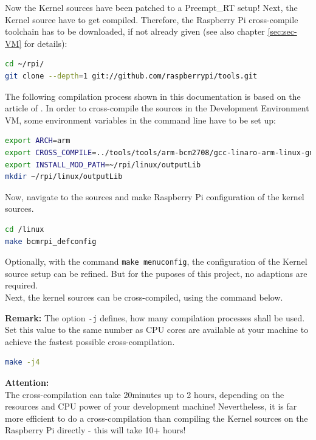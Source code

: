 Now the Kernel sources have been patched to a Preempt\_RT setup! Next, the Kernel source have to get compiled. Therefore, the Raspberry Pi cross-compile toolchain has to be downloaded, if not already given (see also chapter \ref{sec:sec-VM} for details):
\begin{lstlisting}[language=bash,otherkeywords={dd,sudo}]
cd ~/rpi/
git clone --depth=1 git://github.com/raspberrypi/tools.git
\end{lstlisting}

The following compilation process shown in this documentation is based on the article of \cite{doc:Kern69}. In order to cross-compile the sources in the Development Environment VM, some environment variables in the command line have to be set up:
\begin{lstlisting}[language=bash,otherkeywords={sudo,export}]
export ARCH=arm
export CROSS_COMPILE=../tools/tools/arm-bcm2708/gcc-linaro-arm-linux-gnueabihf-raspbian-x64/bin/arm-linux-gnueabi-
export INSTALL_MOD_PATH=~/rpi/linux/outputLib
mkdir ~/rpi/linux/outputLib
\end{lstlisting}

Now, navigate to the sources and make Raspberry Pi configuration of the kernel sources.
\begin{lstlisting}[language=bash,otherkeywords={make,dd,sudo}]
cd /linux
make bcmrpi_defconfig
\end{lstlisting}

Optionally, with the command \texttt{make menuconfig}, the configuration of the Kernel source setup can be refined. But for the puposes of this project, no adaptions are required.\\
Next, the kernel sources can be cross-compiled, using the command below.

\textbf{Remark:} The option \texttt{-j} defines, how many compilation processes shall be used. Set this value to the same number as CPU cores are available at your machine to achieve the fastest possible cross-compilation.
\begin{lstlisting}[language=bash,otherkeywords={make,dd,sudo}]
make -j4
\end{lstlisting}

\textbf{Attention:}\\
The cross-compilation can take 20minutes up to 2 hours, depending on the resources and CPU power of your development machine! Nevertheless, it is far more efficient to do a cross-compilation than compiling the Kernel sources on the Raspberry Pi directly - this will take 10+ hours!

